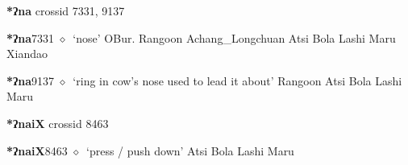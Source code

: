 \item
\textbf{*ʔna}
  {\tiny crossid 7331, 9137}
  \begin{list}{}{\leftmargin=1.5em \itemindent=-1.5em}
  \item {\footnotesize \textbf{*ʔna}}{\tiny 7331}
         $\diamond$~`nose'
         OBur. 
\hspace{1ex}
         Rangoon 
\hspace{1ex}
         Achang\_Longchuan 
\hspace{1ex}
         Atsi 
\hspace{1ex}
         Bola 
\hspace{1ex}
         Lashi 
\hspace{1ex}
         Maru 
\hspace{1ex}
         Xiandao 
  \item {\footnotesize \textbf{*ʔna}}{\tiny 9137}
\hspace{1ex}
         $\diamond$~`ring in cow's nose used to lead it about'
         Rangoon 
\hspace{1ex}
         Atsi 
\hspace{1ex}
         Bola 
\hspace{1ex}
         Lashi 
\hspace{1ex}
         Maru 
  \end{list}
\item
\textbf{*ʔnaiX}
  {\tiny crossid 8463}
  \begin{list}{}{\leftmargin=1.5em \itemindent=-1.5em}
  \item {\footnotesize \textbf{*ʔnaiX}}{\tiny 8463}
         $\diamond$~`press / push down'
         Atsi 
\hspace{1ex}
         Bola 
\hspace{1ex}
         Lashi 
\hspace{1ex}
         Maru 
  \end{list}
\item
